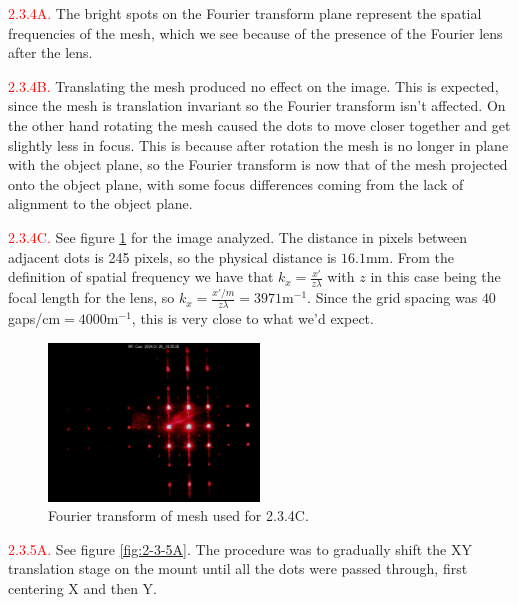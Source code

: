 \documentclass[letterpaper, reqno,11pt]{article}
\begin{document}
\noindent \textcolor{red}{2.3.4A.} The bright spots on the Fourier transform plane represent the spatial frequencies of the mesh, which we see because of the presence of the Fourier lens after the lens.

\noindent \textcolor{red}{2.3.4B.} Translating the mesh produced no effect on the image. This is expected, since the mesh is translation invariant so the Fourier transform isn't affected. On the other hand rotating the mesh caused the dots to move closer together and get slightly less in focus. This is because after rotation the mesh is no longer in plane with the object plane, so the Fourier transform is now that of the mesh projected onto the object plane, with some focus differences coming from the lack of alignment to the object plane.

\noindent \textcolor{red}{2.3.4C.} See figure \ref{fig:2-3-4C} for the image analyzed. The distance in pixels between adjacent dots is 245 pixels, so the physical distance is $16.1$mm. From the definition of spatial frequency we have that $k_x= \frac{x'}{z\lambda}$ with $z$ in this case being the focal length for the lens, so $k_x= \frac{x' /m}{z\lambda}=3971\text{m}^{-1}$. Since the grid spacing was $40$ gaps/cm$=4000\text{m}^{-1}$, this is very close to what we'd expect.

\begin{figure}[tb]
    \centering
    \includegraphics[width=0.5\textwidth]{Fourier/translations/media/im_0088_20240126_193526.jpg}
    \caption{Fourier transform of mesh used for 2.3.4C.}
    \label{fig:2-3-4C}
\end{figure}

\noindent \textcolor{red}{2.3.5A.} See figure \ref{fig:2-3-5A}. The procedure was to gradually shift the XY translation stage on the mount until all the dots were passed through, first centering X and then Y.
\end{document}
